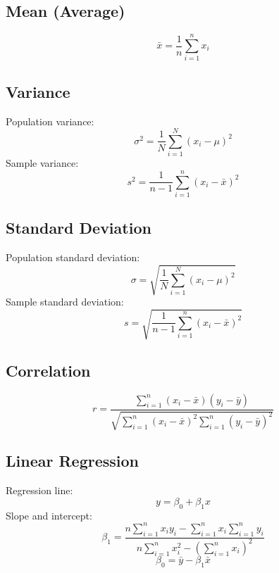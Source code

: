 \documentclass{article}
\begin{document}
\subsection*{Mean (Average)}
\[
\bar{x} = \frac{1}{n} \sum_{i=1}^{n} x_i
\]

\subsection*{Variance}
Population variance:
\[
\sigma^2 = \frac{1}{N} \sum_{i=1}^{N} (x_i - \mu)^2
\]
Sample variance:
\[
s^2 = \frac{1}{n-1} \sum_{i=1}^{n} (x_i - \bar{x})^2
\]

\subsection*{Standard Deviation}
Population standard deviation:
\[
\sigma = \sqrt{\frac{1}{N} \sum_{i=1}^{N} (x_i - \mu)^2}
\]
Sample standard deviation:
\[
s = \sqrt{\frac{1}{n-1} \sum_{i=1}^{n} (x_i - \bar{x})^2}
\]

\subsection*{Correlation}
\[
r = \frac{\sum_{i=1}^{n} (x_i - \bar{x})(y_i - \bar{y})}{\sqrt{\sum_{i=1}^{n} (x_i - \bar{x})^2 \sum_{i=1}^{n} (y_i - \bar{y})^2}}
\]

\subsection*{Linear Regression}
Regression line:
\[
y = \beta_0 + \beta_1 x
\]
Slope and intercept:
\[
\beta_1 = \frac{n \sum_{i=1}^{n} x_i y_i - \sum_{i=1}^{n} x_i \sum_{i=1}^{n} y_i}{n \sum_{i=1}^{n} x_i^2 - \left(\sum_{i=1}^{n} x_i\right)^2}
\]
\[
\beta_0 = \bar{y} - \beta_1 \bar{x}
\]
\end{document}
